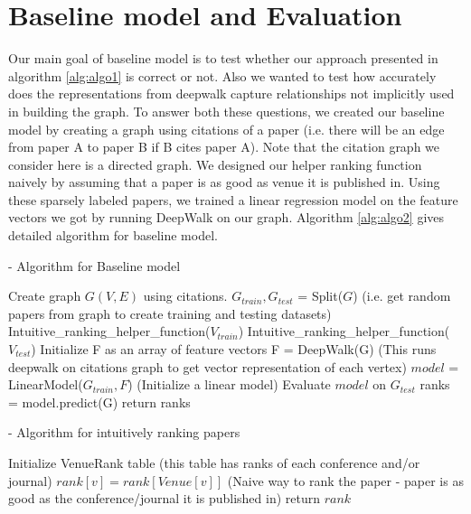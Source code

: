 \documentclass[a4paper, 11pt]{article}
\begin{document}
\section{Baseline model and Evaluation}
Our main goal of baseline model is to test whether our approach presented in algorithm \ref{alg:algo1} is correct or not. Also we wanted to test how accurately does the representations from deepwalk capture relationships not implicitly used in building the graph. To answer both these questions, we created our baseline model by creating a graph using citations of a paper (i.e. there will be an edge from paper A to paper B if B cites paper A). Note that the citation graph we consider here is a directed graph. We designed our helper ranking function naively by assuming that a paper is as good as venue it is published in. Using these sparsely labeled papers, we trained a linear regression model on the feature vectors we got by running DeepWalk on our graph. Algorithm \ref{alg:algo2} gives detailed algorithm for baseline model.
\begin{algorithm}
\caption{ - Algorithm for Baseline model}
\label{alg:algo2}
\begin{algorithmic}[1]
\State Create graph $G(V,E)$ using citations.
\State $G_{train}, G_{test}$ = Split($G$) (i.e. get random papers from graph to create training and testing datasets)
\State Intuitive\_ranking\_helper\_function($V_{train}$)
\State Intuitive\_ranking\_helper\_function($V_{test}$)
\State Initialize F as an array of feature vectors
\State F = DeepWalk(G) (This runs deepwalk on citations graph to get vector representation of each vertex)
\State $model$ = LinearModel($G_{train},F$) (Initialize a linear model)
\State Evaluate  $model$ on $G_{test}$
\State ranks = model.predict(G)
\State return ranks
\end{algorithmic}
\end{algorithm}
\begin{algorithm}
\caption{ - Algorithm for intuitively ranking papers}
\label{alg:algo3}
\begin{algorithmic}[1]
\State Initialize VenueRank table (this table has ranks of each conference and/or journal)
	\State $rank[v] = rank[Venue[v]]$ (Naive way to rank the paper - paper is as good as the conference/journal it is published in)
\EndFor
\State return $rank$
\EndProcedure
\end{algorithmic}
\end{algorithm}
\end{document}
